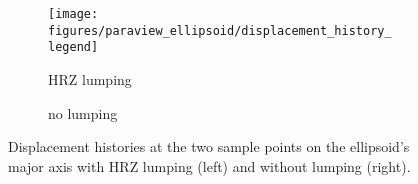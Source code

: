 \begin{figure}[!h]
	\centering
	\begin{subfigure}{0.95\textwidth}
		\centering
		\texttt{[image: figures/paraview\_ellipsoid/displacement\_history\_legend]}
	\end{subfigure}
	\begin{subfigure}{0.49\textwidth}
		\centering
		\caption{HRZ lumping}
	\end{subfigure}
	\hfill
	\begin{subfigure}{0.49\textwidth}
		\centering
		\caption{no lumping}
	\end{subfigure}
	\caption{Displacement histories at the two sample points on the ellipsoid's major axis with HRZ lumping (left) and without lumping (right).}
	\label{fig:ellipsoid_displacement_history}
\end{figure}

